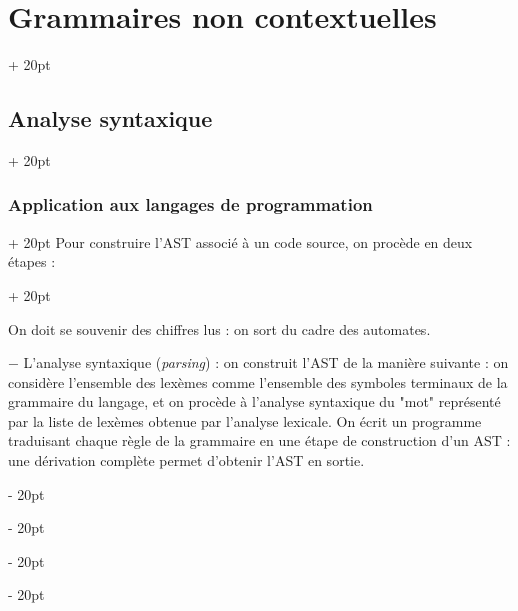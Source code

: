 \documentclass[a4paper, 12pt, twoside]{article}
\newcommand{\ind}[1][20pt]{\advance\leftskip + #1}
\newcommand{\deind}[1][20pt]{\advance\leftskip - #1}
\newenvironment{indt}[2][20pt]{#2 \par \ind[#1]}{\par \deind} %
\begin{document}
\begin{indt}{\section{Grammaires non contextuelles}}
\begin{indt}{\subsection{Analyse syntaxique}}
\begin{indt}{\subsubsection{Application aux langages de programmation}}
\begin{indt}{Pour construire l'AST associé à un code source, on procède en deux étapes :}
\begin{center}
                    \end{center}

                    On doit se souvenir des chiffres lus : on sort du cadre des automates.

                    \vspace{12pt}
                    
                    $-$ L'analyse syntaxique (\textit{parsing}) : on construit l'AST de la manière suivante : on considère l'ensemble des lexèmes comme l'ensemble des symboles terminaux de la grammaire du langage, et on procède à l'analyse syntaxique du "mot" représenté par la liste de lexèmes obtenue par l'analyse lexicale.
                    On écrit un programme traduisant chaque règle de la grammaire en une étape de construction d'un AST : une dérivation complète permet d'obtenir l'AST en sortie.

                    \vspace{6pt}
                    

\end{indt}
\end{indt}
\end{indt}
\end{indt}
\end{document}
